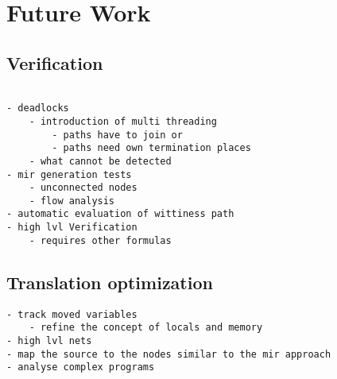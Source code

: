\chapter{Future Work}
\label{future}
\section{Verification}
\begin{verbatim}
    
- deadlocks
    - introduction of multi threading
        - paths have to join or
        - paths need own termination places
    - what cannot be detected
- mir generation tests
    - unconnected nodes
    - flow analysis
- automatic evaluation of wittiness path 
- high lvl Verification
    - requires other formulas
\end{verbatim}

\section{Translation optimization}
\begin{verbatim}
- track moved variables
    - refine the concept of locals and memory
- high lvl nets
- map the source to the nodes similar to the mir approach
- analyse complex programs
\end{verbatim}